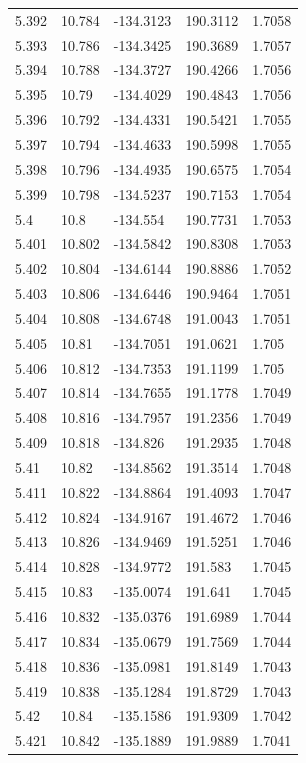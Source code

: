 \begin{tabular}{lllll}
5.392 & 10.784 & -134.3123 & 190.3112 & 1.7058 \\
5.393 & 10.786 & -134.3425 & 190.3689 & 1.7057 \\
5.394 & 10.788 & -134.3727 & 190.4266 & 1.7056 \\
5.395 & 10.79 & -134.4029 & 190.4843 & 1.7056 \\
5.396 & 10.792 & -134.4331 & 190.5421 & 1.7055 \\
5.397 & 10.794 & -134.4633 & 190.5998 & 1.7055 \\
5.398 & 10.796 & -134.4935 & 190.6575 & 1.7054 \\
5.399 & 10.798 & -134.5237 & 190.7153 & 1.7054 \\
5.4 & 10.8 & -134.554 & 190.7731 & 1.7053 \\
5.401 & 10.802 & -134.5842 & 190.8308 & 1.7053 \\
5.402 & 10.804 & -134.6144 & 190.8886 & 1.7052 \\
5.403 & 10.806 & -134.6446 & 190.9464 & 1.7051 \\
5.404 & 10.808 & -134.6748 & 191.0043 & 1.7051 \\
5.405 & 10.81 & -134.7051 & 191.0621 & 1.705 \\
5.406 & 10.812 & -134.7353 & 191.1199 & 1.705 \\
5.407 & 10.814 & -134.7655 & 191.1778 & 1.7049 \\
5.408 & 10.816 & -134.7957 & 191.2356 & 1.7049 \\
5.409 & 10.818 & -134.826 & 191.2935 & 1.7048 \\
5.41 & 10.82 & -134.8562 & 191.3514 & 1.7048 \\
5.411 & 10.822 & -134.8864 & 191.4093 & 1.7047 \\
5.412 & 10.824 & -134.9167 & 191.4672 & 1.7046 \\
5.413 & 10.826 & -134.9469 & 191.5251 & 1.7046 \\
5.414 & 10.828 & -134.9772 & 191.583 & 1.7045 \\
5.415 & 10.83 & -135.0074 & 191.641 & 1.7045 \\
5.416 & 10.832 & -135.0376 & 191.6989 & 1.7044 \\
5.417 & 10.834 & -135.0679 & 191.7569 & 1.7044 \\
5.418 & 10.836 & -135.0981 & 191.8149 & 1.7043 \\
5.419 & 10.838 & -135.1284 & 191.8729 & 1.7043 \\
5.42 & 10.84 & -135.1586 & 191.9309 & 1.7042 \\
5.421 & 10.842 & -135.1889 & 191.9889 & 1.7041 \\

\end{tabular}
